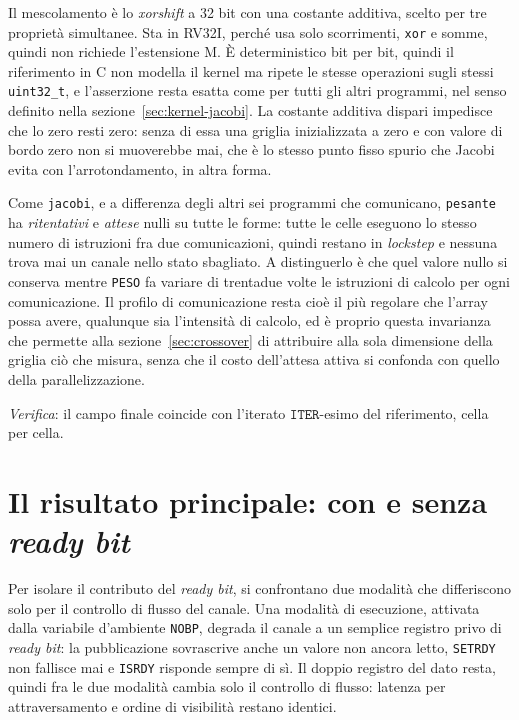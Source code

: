Il mescolamento è lo \emph{xorshift} a 32 bit con una costante additiva, scelto
per tre proprietà simultanee. Sta in RV32I, perché usa solo scorrimenti,
\texttt{xor} e somme, quindi non richiede l'estensione M. È deterministico bit
per bit, quindi il riferimento in C non modella il kernel ma ripete le stesse
operazioni sugli stessi \texttt{uint32\_t}, e l'asserzione resta esatta come per
tutti gli altri programmi, nel senso definito nella
sezione~\ref{sec:kernel-jacobi}. La costante additiva dispari impedisce che lo zero
resti zero: senza di essa una griglia inizializzata a zero e con valore di bordo zero non si
muoverebbe mai, che è lo stesso punto fisso spurio che Jacobi evita con
l'arrotondamento, in altra forma.

Come \texttt{jacobi}, e a differenza degli altri sei programmi che comunicano,
\texttt{pesante} ha \emph{ritentativi} e \emph{attese} nulli su tutte le forme:
tutte le celle eseguono lo stesso numero di istruzioni fra due comunicazioni,
quindi restano in \emph{lockstep} e nessuna trova mai un canale nello stato
sbagliato. A distinguerlo è che quel valore nullo si conserva mentre
\texttt{PESO} fa variare di trentadue volte le istruzioni di calcolo per ogni
comunicazione. Il profilo di comunicazione resta cioè il più regolare che
l'array possa avere, qualunque sia l'intensità di calcolo, ed è proprio questa
invarianza che permette alla sezione~\ref{sec:crossover} di attribuire alla sola
dimensione della griglia ciò che misura, senza che il costo dell'attesa attiva
si confonda con quello della parallelizzazione.

\emph{Verifica}: il campo finale coincide con l'iterato
$\mathtt{ITER}$-esimo del riferimento, cella per cella.

\section{Il risultato principale: con e senza \emph{ready bit}}
\label{sec:nobp}

Per isolare il contributo del \emph{ready bit}, si confrontano due modalità
che differiscono solo per il controllo di flusso del canale. Una modalità
di esecuzione, attivata dalla variabile d'ambiente \texttt{NOBP}, degrada il canale a un 
semplice registro privo di \emph{ready bit}: la pubblicazione sovrascrive anche
un valore non ancora letto, \texttt{SETRDY} non fallisce mai e \texttt{ISRDY}
risponde sempre di sì. Il doppio registro del dato resta, quindi fra le due modalità cambia
solo il controllo di flusso: latenza per attraversamento e ordine di visibilità restano identici.


